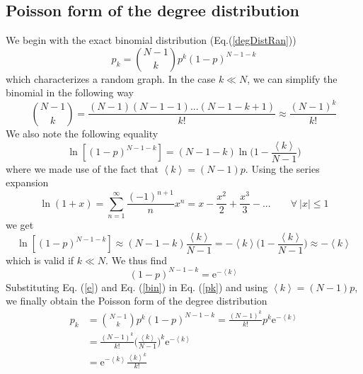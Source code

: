 \documentclass[11 pt , letterpaper , twoside , openright]{book}
\begin{document}
\subsection{Poisson form of the degree distribution}\label{poiss}
We begin with the exact binomial distribution (Eq.(\ref{degDistRan}))
\begin{equation}\label{pk}
	p_k = \binom{N-1}{k}p^k (1-p)^{N-1-k}
\end{equation}
which characterizes a random graph. In the case $k \ll N$, we can simplify the binomial in the following way \cite{Albert2014}
\begin{equation}\label{bin}
	\binom{N-1}{k} = \frac{(N-1)(N-1-1)...(N-1-k+1)}{k!} \approx \frac{(N-1)^k}{k!}
\end{equation}
We also note the following equality \cite{Albert2014}
\begin{equation}
	\ln[(1-p)^{N-1-k}] = (N-1-k)\ln\bigg(1 - \frac{\left<k\right>}{N-1} \bigg)
\end{equation}
where we made use of the fact that $\left<k\right> = (N-1)p$. Using the series expansion \cite{Albert2014}
\begin{equation}
	\ln(1+x) = \sum_{n=1}^{\infty}\frac{(-1)^{n+1}}{n}x^n = x - \frac{x^2}{2} + \frac{x^3}{3} - ...  \qquad \forall \ |x| \leqslant 1
\end{equation}
we get \cite{Albert2014}
\begin{equation}
	\ln[(1-p)^{N-1-k}] \approx (N-1-k) \frac{\left<k\right>}{N-1} = - \left<k\right>\bigg(1 - \frac{\left<k\right>}{N-1} \bigg) \approx - \left<k\right>
\end{equation}
which is valid if $k \ll N$. We thus find \cite{Albert2014}
\begin{equation}\label{e}
	(1-p)^{N-1-k} = \mathrm{e}^{-\left<k\right>}
\end{equation}
Substituting Eq. (\ref{e}) and Eq. (\ref{bin}) in Eq. (\ref{pk}) and using $\left<k\right> = (N-1)p$, we finally obtain the Poisson form of the degree distribution \cite{Albert2014}
\begin{equation}
\begin{split}
	p_k &= \binom{N-1}{k}p^k (1-p)^{N-1-k} = \frac{(N-1)^k}{k!} p^k \mathrm{e}^{-\left<k\right>} \\
&= \frac{(N-1)^k}{k!} \bigg(\frac{\left<k\right>}{N-1} \bigg)^k \mathrm{e}^{-\left<k\right>}\\
&= \mathrm{e}^{-\left<k\right>}\frac{\left<k\right>^k}{k!}
\end{split}
\end{equation}
\end{document}
